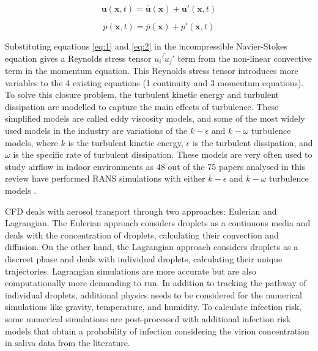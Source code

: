 \documentclass[a4paper,12pt]{elsarticle}
\begin{document}
\begin{equation}
    \textbf{u}(\textbf{x},t) = \bar{\textbf{u}}(\textbf{x}) + \textbf{u}'(\textbf{x},t)
\label{eq:1}
\end{equation}

\begin{equation}
    p(\textbf{x},t) = \bar{p}(\textbf{x}) + p'(\textbf{x},t)
\label{eq:2}
\end{equation}

Substituting equations \ref{eq:1} and \ref{eq:2} in the incompressible Navier-Stokes equation gives a Reynolds stress tensor $\overline{u_i'u_j'}$ term from the non-linear convective term in the momentum equation. This Reynolds stress tensor introduces more variables to the 4 existing equations (1 continuity and 3 momentum equations). To solve this closure problem, the turbulent kinetic energy and turbulent dissipation are modelled to capture the main effects of turbulence. These simplified models are called eddy viscosity models, and some of the most widely used models in the industry are variations of the $k-\epsilon$ and $k-\omega$ turbulence models, where $k$ is the turbulent kinetic energy, $\epsilon$ is the turbulent dissipation, and $\omega$ is the specific rate of turbulent dissipation. These models are very often used to study airflow in indoor environments as  48 out of the 75 papers analysed in this review have performed RANS simulations with either $k-\epsilon$ \cite{li2020investigating,liu2020experimental,aliyu2021dispersion} and $k-\omega$ turbulence models \cite{lordly2022understanding,xu2023cfd,cortellessa2023effectiveness,arpino2023cfd}.

CFD deals with aerosol transport through two approaches: Eulerian and Lagrangian. The Eulerian approach considers droplets as a continuous media and deals with the concentration of droplets, calculating their convection and diffusion. On the other hand, the Lagrangian approach considers droplets as a discreet phase and deals with individual droplets, calculating their unique trajectories. Lagrangian simulations are more accurate but are also computationally more demanding to run. In addition to tracking the pathway of individual droplets, additional physics needs to be considered for the numerical simulations like gravity, temperature, and humidity. To calculate infection risk, some numerical simulations are post-processed with additional infection risk models that obtain a probability of infection considering the virion concentration in saliva data from the literature.
\end{document}
